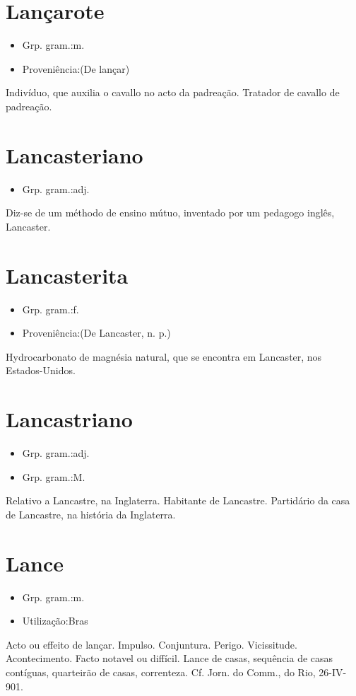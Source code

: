 \section{Lançarote}
\begin{itemize}
\item {Grp. gram.:m.}
\end{itemize}
\begin{itemize}
\item {Proveniência:(De \textunderscore lançar\textunderscore )}
\end{itemize}
Indivíduo, que auxilia o cavallo no acto da padreação.
Tratador de cavallo de padreação.
\section{Lancasteriano}
\begin{itemize}
\item {Grp. gram.:adj.}
\end{itemize}
Diz-se de um méthodo de ensino mútuo, inventado por um pedagogo inglês, Lancaster.
\section{Lancasterita}
\begin{itemize}
\item {Grp. gram.:f.}
\end{itemize}
\begin{itemize}
\item {Proveniência:(De \textunderscore Lancaster\textunderscore , n. p.)}
\end{itemize}
Hydrocarbonato de magnésia natural, que se encontra em Lancaster, nos Estados-Unidos.
\section{Lancastriano}
\begin{itemize}
\item {Grp. gram.:adj.}
\end{itemize}
\begin{itemize}
\item {Grp. gram.:M.}
\end{itemize}
Relativo a Lancastre, na Inglaterra.
Habitante de Lancastre.
Partidário da casa de Lancastre, na história da Inglaterra.
\section{Lance}
\begin{itemize}
\item {Grp. gram.:m.}
\end{itemize}
\begin{itemize}
\item {Utilização:Bras}
\end{itemize}
Acto ou effeito de lançar.
Impulso.
Conjuntura.
Perigo.
Vicissitude.
Acontecimento.
Facto notavel ou diffícil.
\textunderscore Lance de casas\textunderscore , sequência de casas contíguas, quarteirão de casas, correnteza. Cf. \textunderscore Jorn. do Comm.\textunderscore , do Rio, 26-IV-901.
